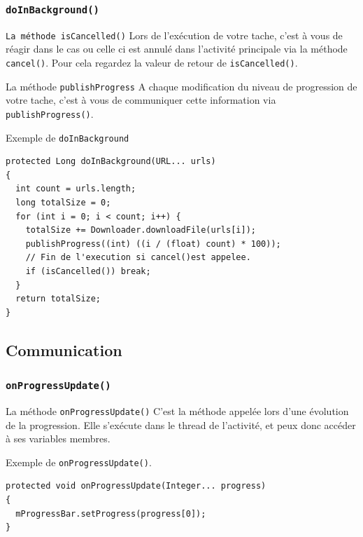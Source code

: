 \documentclass{beamer}
\begin{document}
\begin{frame}
\frametitle{\verb!doInBackground()!}
\begin{block}{\verb!La méthode isCancelled()!}
Lors de l'exécution de votre tache, c'est à vous de réagir dans le cas ou celle ci est annulé dans l'activité principale via la méthode \verb!cancel()!. Pour cela regardez la valeur de retour de \verb!isCancelled()!.
\end{block}
\pause
\begin{block}{La méthode \verb!publishProgress!}
A chaque modification du niveau de progression de votre tache, c'est à vous de communiquer cette information via \verb!publishProgress()!.
\end{block}
\end{frame}

\begin{frame}[fragile]
\begin{exampleblock}{Exemple de \verb!doInBackground!}
\begin{lstlisting}
protected Long doInBackground(URL... urls)
{
  int count = urls.length;
  long totalSize = 0;
  for (int i = 0; i < count; i++) {
    totalSize += Downloader.downloadFile(urls[i]);
    publishProgress((int) ((i / (float) count) * 100));
    // Fin de l'execution si cancel()est appelee.
    if (isCancelled()) break;
  }
  return totalSize;
}
\end{lstlisting}
\end{exampleblock}
\end{frame}

\subsection{Communication}
\begin{frame}[fragile]
\frametitle{\verb!onProgressUpdate()!}
\begin{block}{La méthode \verb!onProgressUpdate()!}
C'est la méthode appelée lors d'une évolution de la progression. Elle s'exécute dans le thread de l'activité, et peux donc accéder à ses variables membres.
\end{block}
\begin{exampleblock}{Exemple de \verb!onProgressUpdate()!.}
\begin{lstlisting}
protected void onProgressUpdate(Integer... progress)
{
  mProgressBar.setProgress(progress[0]);
}
\end{lstlisting}
\end{exampleblock}
\end{frame}
\end{document}
